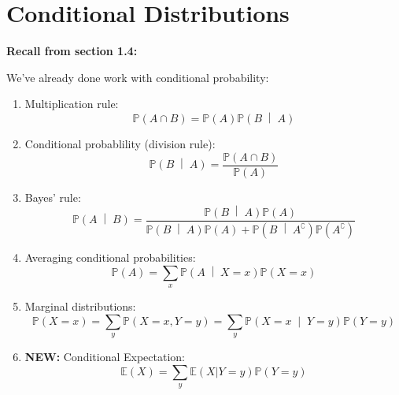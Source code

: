 \documentclass[titlepage, 12pt, leqno]{article}
\begin{document}
\pagebreak
\section{Conditional Distributions}
\textbf{Recall from section 1.4:}

We've already done work with conditional probability:
\begin{enumerate}
    \item Multiplication rule:
        \[
            \mathbb{P}(A \cap B) = \mathbb{P}(A) \mathbb{P}\left(B \;\middle|\; A\right) 
        \]
    \item Conditional probablility (division rule):
        \[
            \mathbb{P}\left(B \;\middle|\; A\right) = 
            \frac{\mathbb{P}(A \cap B)}{\mathbb{P}(A)}
        \]
    \item Bayes' rule:
        \[
        \mathbb{P}\left(A \;\middle|\; B\right) =
        \frac{ \mathbb{P}\left(B \;\middle|\; A\right) \mathbb{P}(A)}
        { \mathbb{P}\left(B \;\middle|\; A\right) \mathbb{P}(A) +
        \mathbb{P}\left(B \;\middle|\; A^\complement \right) \mathbb{P}(A^\complement )}
        \]
    \item Averaging conditional probabilities:
        \[
            \mathbb{P}(A) = 
            \sum_{x} \mathbb{P}\left(A \;\middle|\; X=x\right) \mathbb{P}(X=x)
        \]
    \item Marginal distributions:
        \[
        \mathbb{P}(X=x) = 
        \sum_{y}\mathbb{P}(X=x, Y=y) = 
        \sum_{y} \mathbb{P}\left(X=x \;\middle|\; Y=y\right) \mathbb{P}(Y=y)
        \] 
    \item \textbf{NEW:} Conditional Expectation:
        \[
            \mathbb{E}(X) = \sum_{y} \mathbb{E}(X|Y=y)\mathbb{P}(Y=y)
        \]
\end{enumerate}
\end{document}
